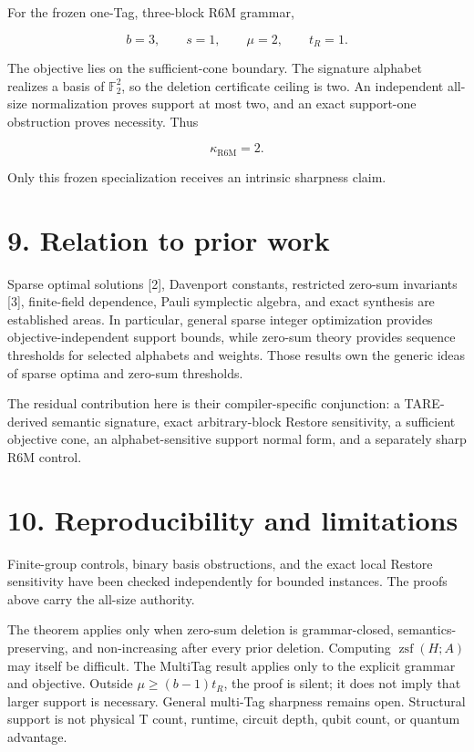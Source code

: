 \documentclass[
  11pt,
]{article}
\begin{document}
For the frozen one-Tag, three-block R6M grammar,

\[
b=3, \qquad s=1, \qquad \mu=2, \qquad t_R=1.
\]

The objective lies on the sufficient-cone boundary. The signature
alphabet realizes a basis of \(\mathbb F_2^2\), so the deletion
certificate ceiling is two. An independent all-size normalization proves
support at most two, and an exact support-one obstruction proves
necessity. Thus

\[
\kappa_{\mathrm{R6M}}=2.
\]

Only this frozen specialization receives an intrinsic sharpness claim.

\hypertarget{relation-to-prior-work}{%
\section{9. Relation to prior work}\label{relation-to-prior-work}}

Sparse optimal solutions {[}2{]}, Davenport constants, restricted
zero-sum invariants {[}3{]}, finite-field dependence, Pauli symplectic
algebra, and exact synthesis are established areas. In particular,
general sparse integer optimization provides objective-independent
support bounds, while zero-sum theory provides sequence thresholds for
selected alphabets and weights. Those results own the generic ideas of
sparse optima and zero-sum thresholds.

The residual contribution here is their compiler-specific conjunction: a
TARE-derived semantic signature, exact arbitrary-block Restore
sensitivity, a sufficient objective cone, an alphabet-sensitive support
normal form, and a separately sharp R6M control.

\hypertarget{reproducibility-and-limitations}{%
\section{10. Reproducibility and
limitations}\label{reproducibility-and-limitations}}

Finite-group controls, binary basis obstructions, and the exact local
Restore sensitivity have been checked independently for bounded
instances. The proofs above carry the all-size authority.

The theorem applies only when zero-sum deletion is grammar-closed,
semantics-preserving, and non-increasing after every prior deletion.
Computing \(\operatorname{zsf}(H; A)\) may itself be difficult. The
MultiTag result applies only to the explicit grammar and objective.
Outside \(\mu\ge(b-1)t_R\), the proof is silent; it does not imply that
larger support is necessary. General multi-Tag sharpness remains open.
Structural support is not physical T count, runtime, circuit depth,
qubit count, or quantum advantage.
\end{document}
